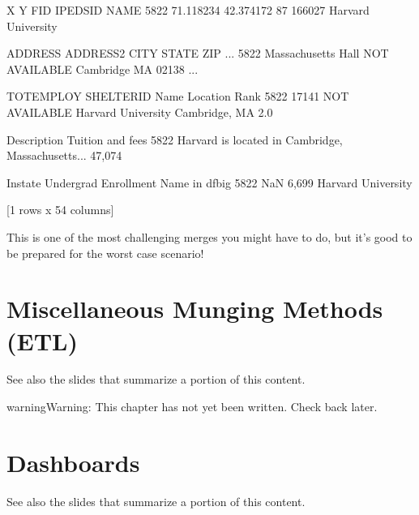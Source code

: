 \documentclass[letterpaper,10pt,english]{sphinxmanual}
\begin{document}
\begin{sphinxVerbatim}[commandchars=\\\{\}]
\PYG{p}{[}\PYG{p}{[}\PYG{p}{]}  \PYG{p}{]}
\end{sphinxVerbatim}

\begin{sphinxVerbatim}[commandchars=\\\{\}]
              X          Y  FID  IPEDSID                NAME  \PYGZbs{}
5822 \PYGZhy{}71.118234  42.374172   87   166027  Harvard University   

                 ADDRESS       ADDRESS2       CITY STATE    ZIP  ...  \PYGZbs{}
5822  Massachusetts Hall  NOT AVAILABLE  Cambridge    MA  02138  ...   

     TOT\PYGZus{}EMPLOY     SHELTER\PYGZus{}ID                Name       Location  Rank  \PYGZbs{}
5822      17141  NOT AVAILABLE  Harvard University  Cambridge, MA   2.0   

                                            Description  Tuition and fees  \PYGZbs{}
5822  Harvard is located in Cambridge, Massachusetts...          \PYGZdl{}47,074    

     In\PYGZhy{}state  Undergrad Enrollment      Name in df\PYGZus{}big  
5822      NaN                 6,699  Harvard University  

[1 rows x 54 columns]
\end{sphinxVerbatim}

This is one of the most challenging merges you might have to do, but it’s good to be prepared for the worst case scenario!


\chapter{Miscellaneous Munging Methods (ETL)}
\label{\detokenize{chapter-13-etl:miscellaneous-munging-methods-etl}}\label{\detokenize{chapter-13-etl::doc}}
See also the slides that summarize a portion of this content.

\begin{sphinxadmonition}{warning}{Warning:}
This chapter has not yet been written.  Check back later.
\end{sphinxadmonition}


\chapter{Dashboards}
\label{\detokenize{chapter-14-dashboards:dashboards}}\label{\detokenize{chapter-14-dashboards::doc}}
See also the slides that summarize a portion of this content.
\end{document}
